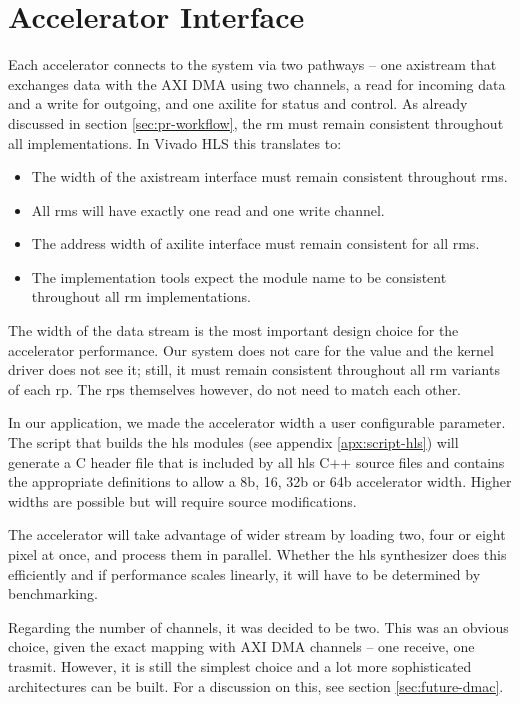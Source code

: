 \section{Accelerator Interface}
\label{sec:accelerator-interface}

Each accelerator connects to the system via two pathways -- one \gls{axistream} that 
exchanges data with the AXI DMA using two channels, a read for incoming data and
a write for outgoing, and one \gls{axilite} for status and control.
As already discussed in section \ref{sec:pr-workflow}, the \gls{rm} must remain
consistent throughout all implementations. In Vivado HLS this translates to:

\begin{itemize}
\item	The width of the \gls{axistream} interface must remain consistent throughout \glspl{rm}.
\item	All \glspl{rm} will have exactly one read and one write channel. 
\item	The address width of \gls{axilite} interface must remain consistent for all \glspl{rm}.
\item	The implementation tools expect the module name to be consistent throughout
	all \gls{rm} implementations.
\end{itemize}

The width of the data stream is the most important design choice for the accelerator performance.
Our system does not care for the value and the kernel driver does not see it; still,
it must remain consistent throughout all \gls{rm} variants of each \gls{rp}. The \glspl{rp} themselves
however, do not need to match each other.

In our application, we made the accelerator width a user configurable parameter. 
The script that builds the \gls{hls} modules (see appendix \ref{apx:script-hls}) 
will generate a C header file that is included by all \gls{hls} C++ source files
and contains the appropriate definitions to allow a 8b, 16, 32b or 64b accelerator width.
Higher widths are possible but will require source modifications.

The accelerator will take advantage of wider stream by loading two, four or eight pixel at once,
and process them in parallel. Whether the \gls{hls} synthesizer does this efficiently and 
if performance scales linearly, it will have to be determined by benchmarking.

Regarding the number of channels, it was decided to be two. This was an obvious choice,
given the exact mapping with AXI DMA channels -- one receive, one trasmit. 
However, it is still the simplest choice and a lot more sophisticated architectures
can be built. For a discussion on this, see section \ref{sec:future-dmac}.

